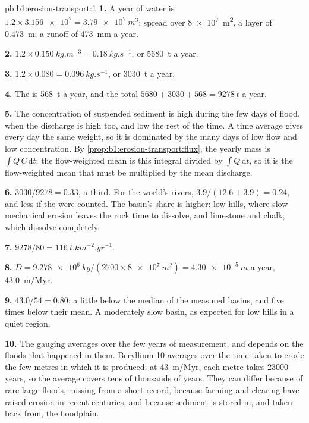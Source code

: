 \begin{solution}{pb:b1:erosion-transport:1}
\textbf{1.} A year of water is $1.2 \times \num{3.156e7} = \qty{3.79e7}{m^3}$;
spread over \qty{8e7}{m^2}, a layer of \qty{0.473}{m}: a runoff of
\qty{473}{mm} a year.

\textbf{2.} $1.2 \times \qty{0.150}{kg.m^{-3}} = \qty{0.18}{kg.s^{-1}}$, or
\qty{5680}{t} a year.

\textbf{3.} $1.2 \times 0.080 = \qty{0.096}{kg.s^{-1}}$, or \qty{3030}{t} a
year.

\textbf{4.} The  is \qty{568}{t} a year, and the total $5680 + 3030 +
568 = \qty{9278}{t}$ a year.

\textbf{5.} The concentration of suspended sediment is high during the few days
of flood, when the discharge is high too, and low the rest of the time. A
time average gives every day the same weight, so it is dominated by the many
days of low flow and low concentration. By
\cref{prop:b1:erosion-transport:flux}, the yearly mass is
$\int Q\,C\,\mathrm dt$; the flow-weighted mean is this integral divided by
$\int Q\,\mathrm dt$, so it is the flow-weighted mean that must be multiplied by
the mean discharge.

\textbf{6.} $3030/9278 = \num{0.33}$, a third. For the world's rivers,
$3.9/(12.6 + 3.9) = \num{0.24}$, and less if the  were counted.
The basin's share is higher: low hills, where slow mechanical erosion leaves
the rock time to dissolve, and limestone and chalk, which dissolve
completely.

\textbf{7.} $9278/80 = \qty{116}{t.km^{-2}.yr^{-1}}$.

\textbf{8.} $D = \qty{9.278e6}{kg}/(2700 \times \qty{8e7}{m^2}) =
\qty{4.30e-5}{m}$ a year, \qty{43.0}{m/Myr}.

\textbf{9.} $43.0/54 = 0.80$: a little below the median of the measured
basins, and five times below their mean. A moderately slow basin, as expected
for low hills in a quiet region.

\textbf{10.} The gauging averages over the few years of measurement, and depends
on the floods that happened in them. Beryllium-10 averages over the time taken
to erode the few metres in which it is produced: at \qty{43}{m/Myr}, each metre
takes \num{23000} years, so the average covers tens of thousands of years. They
can differ because of rare large floods, missing from a short record, because
farming and clearing have raised erosion in recent centuries, and because
sediment is stored in, and taken back from, the floodplain.


\end{solution}
